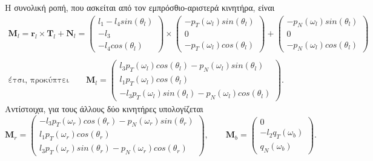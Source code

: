 Η συνολική ροπή, που ασκείται από τον εμπρόσθιο-αριστερά κινητήρα, είναι
\begin{gather*}
    \mathbf{M}_l = \mathbf{r}_l \times \mathbf{T}_l + \mathbf{N}_l =
    \begin{pmatrix}
        {l_1 - l_4 sin(\theta_l)} \\
        {-l_3}                     \\
        {-l_4 cos(\theta_l)}
    \end{pmatrix} \times
    \begin{pmatrix}
        -p_T(\omega_l)sin(\theta_l) \\
        0                           \\
        -p_T(\omega_l)cos(\theta_l)
    \end{pmatrix} +
    \begin{pmatrix}
        -p_N(\omega_l)sin(\theta_l) \\
        0                          \\
        -p_N(\omega_l)cos(\theta_l)
    \end{pmatrix}  \\\\
    \text{έτσι, προκύπτει}\qquad
    \mathbf{M}_l =
    \begin{pmatrix}
        {l_3 p_T(\omega_l)cos(\theta_l)-p_N(\omega_l)sin(\theta_l)} \\[3pt]
        {l_1 p_T(\omega_l)cos(\theta_l)}                            \\[3pt]
        {-l_3 p_T(\omega_l)sin(\theta_l)-p_N(\omega_l)cos(\theta_l)}
    \end{pmatrix}.
\end{gather*}
Αντίστοιχα, για τους άλλους δύο κινητήρες υπολογίζεται
\begin{equation*}
    \mathbf{M}_r =
    \begin{pmatrix}
        {-l_3 p_T(\omega_r)cos(\theta_r)-p_N(\omega_r)sin(\theta_r)} \\[3pt]
        {l_1 p_T(\omega_r)cos(\theta_r)}                             \\[3pt]
        {l_3 p_T(\omega_r)sin(\theta_r)-p_N(\omega_r)cos(\theta_r)}
    \end{pmatrix},\qquad
    \mathbf{M}_b =
    \begin{pmatrix}
        {0}                  \\[3pt]
        {-l_2 q_T(\omega_b)} \\[3pt]
        {q_N(\omega_b)}
    \end{pmatrix}.
\end{equation*}

